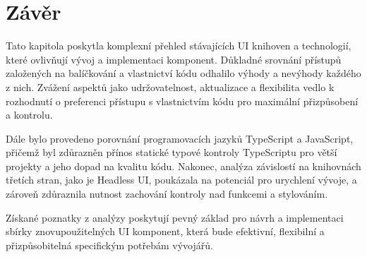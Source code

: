 \section{Závěr}
Tato kapitola poskytla komplexní přehled stávajících UI knihoven a technologií, které ovlivňují vývoj a implementaci komponent. Důkladné srovnání přístupů založených na balíčkování a vlastnictví kódu odhalilo výhody a nevýhody každého z nich. Zvážení aspektů jako udržovatelnost, aktualizace a flexibilita vedlo k rozhodnutí o preferenci přístupu s vlastnictvím kódu pro maximální přizpůsobení a kontrolu.

Dále bylo provedeno porovnání programovacích jazyků TypeScript a JavaScript, přičemž byl zdůrazněn přínos statické typové kontroly TypeScriptu pro větší projekty a jeho dopad na kvalitu kódu. Nakonec, analýza závislostí na knihovnách třetích stran, jako je Headless UI, poukázala na potenciál pro urychlení vývoje, a zároveň zdůraznila nutnost zachování kontroly nad funkcemi a stylováním.

Získané poznatky z analýzy poskytují pevný základ pro návrh a implementaci sbírky znovupoužitelných UI komponent, která bude efektivní, flexibilní a přizpůsobitelná specifickým potřebám vývojářů.

